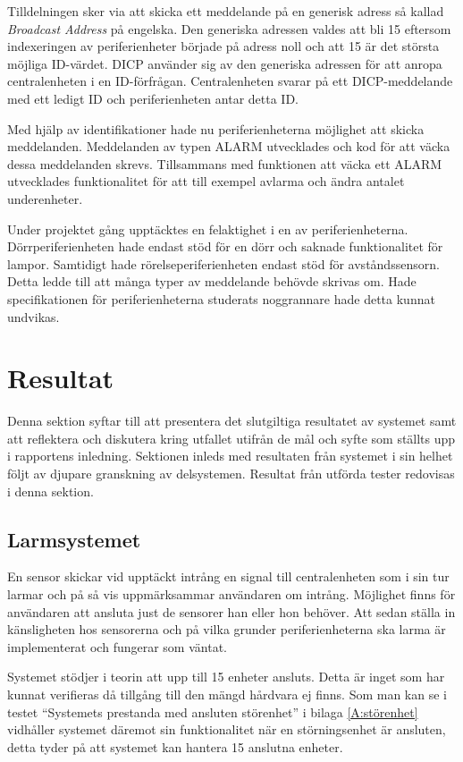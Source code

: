 \documentclass[a4paper]{article}
\begin{document}
Tilldelningen sker via att skicka ett meddelande på en generisk adress så kallad \textit{Broadcast Address} på engelska.
Den generiska adressen valdes att bli 15 eftersom indexeringen av periferienheter började på adress noll och att 15 är det största möjliga ID-värdet.
DICP använder sig av den generiska adressen för att anropa centralenheten i en ID-förfrågan.
Centralenheten svarar på ett DICP-meddelande med ett ledigt ID och periferienheten antar detta ID.

Med hjälp av identifikationer hade nu periferienheterna möjlighet att skicka meddelanden.
Meddelanden av typen ALARM utvecklades och kod för att väcka dessa meddelanden skrevs.
Tillsammans med funktionen att väcka ett ALARM utvecklades funktionalitet för att till exempel avlarma och ändra antalet underenheter.

Under projektet gång upptäcktes en felaktighet i en av periferienheterna.
Dörrperiferienheten hade endast stöd för en dörr och saknade funktionalitet för lampor.
Samtidigt hade rörelseperiferienheten endast stöd för avståndssensorn.
Detta ledde till att många typer av meddelande behövde skrivas om.
Hade specifikationen för periferienheterna studerats noggrannare hade detta kunnat undvikas.

\newpage
\section{Resultat}
Denna sektion syftar till att presentera det slutgiltiga resultatet av systemet samt att reflektera och diskutera kring utfallet utifrån de mål och syfte som ställts upp i rapportens inledning.
Sektionen inleds med resultaten från systemet i sin helhet följt av djupare granskning av delsystemen.
Resultat från utförda tester redovisas i denna sektion.

\subsection{Larmsystemet}
En sensor skickar vid upptäckt intrång en signal till centralenheten som i sin tur larmar och på så vis uppmärksammar användaren om intrång.
Möjlighet finns för användaren att ansluta just de sensorer han eller hon behöver.
Att sedan ställa in känsligheten hos sensorerna och på vilka grunder periferienheterna ska larma är implementerat och fungerar som väntat.

Systemet stödjer i teorin att upp till 15 enheter ansluts. Detta är inget som har kunnat verifieras då tillgång till den mängd hårdvara ej finns.
Som man kan se i testet ``Systemets prestanda med ansluten störenhet'' i bilaga \ref{A:störenhet} vidhåller systemet däremot sin funktionalitet när en störningsenhet är ansluten, detta tyder på att systemet kan hantera 15 anslutna enheter.
\end{document}

